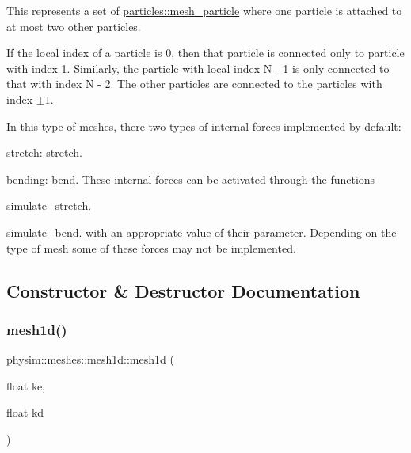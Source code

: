 This represents a set of \hyperlink{classphysim_1_1particles_1_1mesh__particle}{particles\+::mesh\+\_\+particle} where one particle is attached to at most two other particles.

If the local index of a particle is 0, then that particle is connected only to particle with index 1. Similarly, the particle with local index N -\/ 1 is only connected to that with index N -\/ 2. The other particles are connected to the particles with index $\pm 1$.

In this type of meshes, there two types of internal forces implemented by default\+:
\begin{DoxyItemize}
\item stretch\+: \hyperlink{classphysim_1_1meshes_1_1mesh1d_a2c5233fc91df5ae5ac41759e4d8419da}{stretch}.
\item bending\+: \hyperlink{classphysim_1_1meshes_1_1mesh1d_a93d3f9fb656f309bf884333bafa9383e}{bend}. These internal forces can be activated through the functions
\item \hyperlink{classphysim_1_1meshes_1_1mesh1d_a7601dc6b7a0b59738bdf89c806fbd4ef}{simulate\+\_\+stretch}.
\item \hyperlink{classphysim_1_1meshes_1_1mesh1d_aaea453fcd1f5f41b6674da822bf53b2f}{simulate\+\_\+bend}. with an appropriate value of their parameter. Depending on the type of mesh some of these forces may not be implemented. 
\end{DoxyItemize}

\subsection{Constructor \& Destructor Documentation}
\mbox{\label{classphysim_1_1meshes_1_1mesh1d_a75cb535a4e9a65b8b1f269b02224b4cc}} 
\subsubsection{\texorpdfstring{mesh1d()}{mesh1d()}}
{\footnotesize\ttfamily physim\+::meshes\+::mesh1d\+::mesh1d (\begin{DoxyParamCaption}\item[{float}]{ke,  }\item[{float}]{kd }\end{DoxyParamCaption})}




